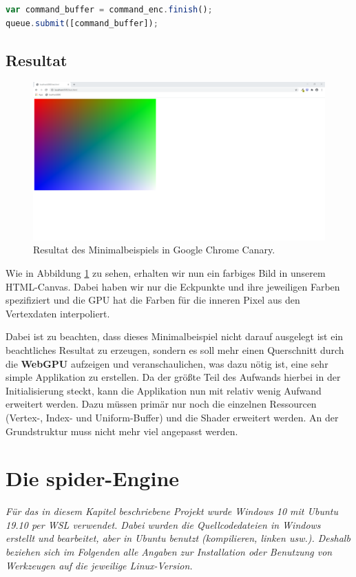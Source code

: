 \documentclass[oneside]{ausarbeitung}
\begin{document}
\begin{lstlisting}[language=JavaScript, label={lst:submit}, caption={Generieren eines \texttt{GPUCommandBuffer} und Abschicken der Befehle an die GPU.}]
var command_buffer = command_enc.finish();
queue.submit([command_buffer]);
\end{lstlisting}

\section{Resultat}
\begin{figure}
    \includegraphics[width=\textwidth]{images/simple_result.png}
    \caption{Resultat des Minimalbeispiels in Google Chrome Canary.}
    \label{fig:simple_result}
\end{figure}
Wie in Abbildung \ref{fig:simple_result} zu sehen, erhalten wir nun ein farbiges Bild in unserem HTML-Canvas. Dabei haben wir nur die Eckpunkte und ihre jeweiligen Farben spezifiziert und die \ac{GPU} hat die Farben für die inneren Pixel aus den Vertexdaten interpoliert.

Dabei ist zu beachten, dass dieses Minimalbeispiel nicht darauf ausgelegt ist ein beachtliches Resultat zu erzeugen, sondern es soll mehr einen Querschnitt durch die \textbf{WebGPU} aufzeigen und veranschaulichen, was dazu nötig ist, eine sehr simple Applikation zu erstellen. Da der größte Teil des Aufwands hierbei in der Initialisierung steckt, kann die Applikation nun mit relativ wenig Aufwand erweitert werden. Dazu müssen primär nur noch die einzelnen Ressourcen (Vertex-, Index- und Uniform-Buffer) und die Shader erweitert werden. An der Grundstruktur muss nicht mehr viel angepasst werden.
\chapter{Die spider-Engine}
\label{cha:spider}
\textit{Für das in diesem Kapitel beschriebene Projekt wurde Windows 10 mit Ubuntu 19.10 per \ac{WSL} \cite{microsoft:wsl} verwendet. Dabei wurden die Quellcodedateien in Windows erstellt und bearbeitet, aber in Ubuntu benutzt (kompilieren, linken usw.). Deshalb beziehen sich im Folgenden alle Angaben zur Installation oder Benutzung von Werkzeugen auf die jeweilige Linux-Version.}
\end{document}

